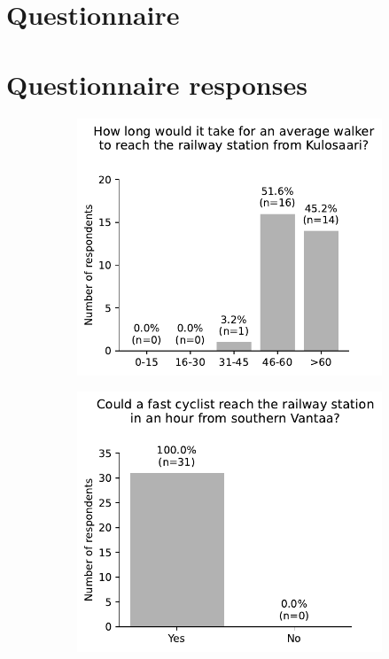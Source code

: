 \begin{appendices}
\makeatletter
\renewcommand{\thesection}{\@arabic\c@section}  %
\makeatother

\section{Questionnaire}



\section{Questionnaire responses}

\begin{figure}[H]
	\centering
	\begin{subfigure}[b]{0.5\textwidth}
		\centering
		\includegraphics[width=\textwidth]{visual/figures/survey/0.pdf}
	\end{subfigure}%
	\hfill
	\begin{subfigure}[b]{0.5\textwidth}
		\centering
		\includegraphics[width=\textwidth]{visual/figures/survey/1.pdf}

\end{subfigure}
\end{figure}
\end{appendices}
